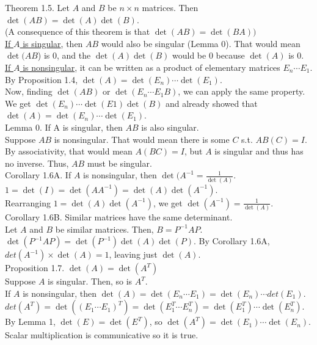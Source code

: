 \documentclass[12pt]{article}
\begin{document}
Theorem 1.5. Let $A$ and $B$ be $n \times n$ matrices. Then $\det(AB)=\det(A) \det(B)$.\\
(A consequence of this theorem is that $\det(AB) = \det(BA))$\\
\underline{If $A$ is singular}, then $AB$ would also be singular (Lemma 0). That would mean $\det(AB$) is 0, and the $\det(A) \det(B)$ would be 0 because $\det(A)$ is 0.\\
\underline{If $A$ is nonsingular}, it can be written as a product of elementary matrices $E_n \cdots E_1$. By Proposition 1.4, $\det(A) = \det(E_n) \cdots \det(E_1)$.\\ Now, finding $\det(AB)$ or $\det(E_n \cdots E_1B)$, we can apply the same property. We get $\det(E_n) \cdots \det(E1) \det(B)$ and already showed that $\det(A) = \det(E_n) \cdots \det(E_1)$.\\

Lemma 0. If A is singular, then $AB$ is also singular.\\
Suppose $AB$ is nonsingular. That would mean there is some $C$ s.t. $AB(C) = I$.\\
By associativity, that would mean $A(BC) = I$, but $A$ is singular and thus has no inverse. Thus, $AB$ must be singular.\\

Corollary 1.6A. If $A$ is nonsingular, then $\det(A^{-1} = \frac{1}{\det(A)}$.\\
$1=\det(I)=\det(AA^{-1})=\det(A) \det(A^{-1})$.\\ Rearranging $1 = \det(A) \det(A^{-1})$, we get $\det(A^ {-1})=\frac{1}{\det(A)}$.\\


Corollary 1.6B. Similar matrices have the same determinant.\\
Let $A$ and $B$ be similar matrices. Then, $B = P^{-1} A P$.\\ 
$\det(P^{-1} A P) = \det(P^{-1}) \det(A) \det(P)$. By Corollary 1.6A,\\
 $det(A^{-1}) \times \det(A) = 1$, leaving just $\det(A)$.\\

Proposition 1.7. $\det(A) = \det(A^T)$\\
Suppose $A$ is singular. Then, so is $A^T$.\\
If $A$ is nonsingular, then $\det(A) = \det(E_n \cdots E_1)= \det(E_n) \cdots det(E_1).$\\
$det(A^T) =\det((E_1 \cdots E_1)^T)=\det(E_1^T \cdots E_n^T)=\det(E_1^T) \cdots \det(E_n^T)$. By Lemma 1, $\det(E)=\det(E^T)$, so $\det(A^T) = \det(E_1)\cdots \det(E_n)$. Scalar multiplication is communicative so it is true.
\end{document}
